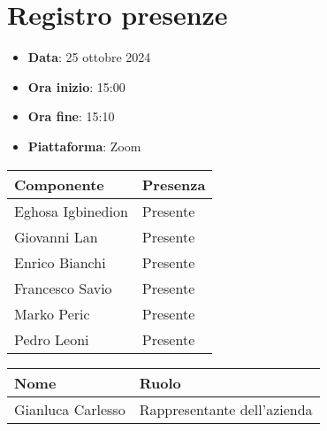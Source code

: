 \documentclass[a4paper, 12pt]{article}
\begin{document}
\section{Registro presenze}
\begin{itemize}
    \item[] \textbf{Data}: 25 ottobre 2024
    \item[] \textbf{Ora inizio}:  15:00
    \item[] \textbf{Ora fine}: 15:10
    \item[] \textbf{Piattaforma}: Zoom	
\end{itemize}
\begin{table}[!h]
\centering
{\renewcommand{\arraystretch}{2}
\begin{tabularx}{\textwidth}{| X | X |}
    \hline
        \textbf{\large Componente} & 
        \textbf{\large Presenza} \\ 
    \hline 
    \hline
        Eghosa Igbinedion&
        Presente \\
    \hline 
        Giovanni Lan&
        Presente \\
    \hline 
        Enrico Bianchi&
        Presente \\
    \hline 
        Francesco Savio&
        Presente \\
    \hline 
        Marko Peric&
        Presente \\
    \hline 
        Pedro Leoni&
        Presente \\
    \hline 

\end{tabularx}}
\end{table}

\begin{table}[!h]
    \centering
    {\renewcommand{\arraystretch}{2}
    \begin{tabularx}{\textwidth}{| X | X |}
        \hline
            \textbf{\large Nome} & 
            \textbf{\large Ruolo} \\ 
        \hline 
        \hline
            Gianluca Carlesso&
            Rappresentante dell'azienda \\
        \hline 

    \end{tabularx}}
\end{table}

\newpage
\end{document}
